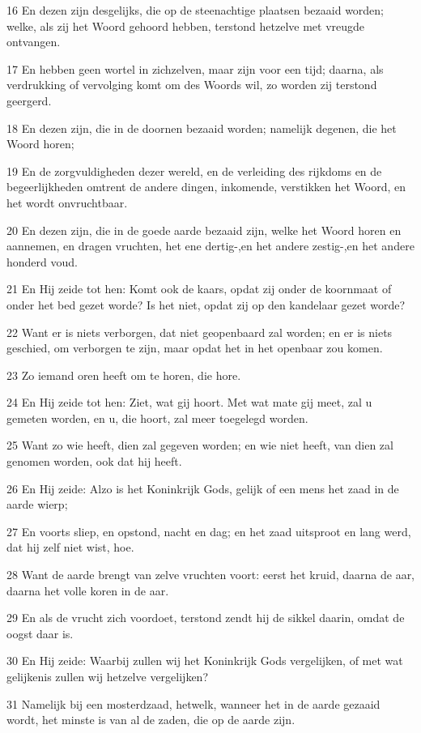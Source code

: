 \par 16 En dezen zijn desgelijks, die op de steenachtige plaatsen bezaaid worden; welke, als zij het Woord gehoord hebben, terstond hetzelve met vreugde ontvangen.
\par 17 En hebben geen wortel in zichzelven, maar zijn voor een tijd; daarna, als verdrukking of vervolging komt om des Woords wil, zo worden zij terstond geergerd.
\par 18 En dezen zijn, die in de doornen bezaaid worden; namelijk degenen, die het Woord horen;
\par 19 En de zorgvuldigheden dezer wereld, en de verleiding des rijkdoms en de begeerlijkheden omtrent de andere dingen, inkomende, verstikken het Woord, en het wordt onvruchtbaar.
\par 20 En dezen zijn, die in de goede aarde bezaaid zijn, welke het Woord horen en aannemen, en dragen vruchten, het ene dertig-,en het andere zestig-,en het andere honderd voud.
\par 21 En Hij zeide tot hen: Komt ook de kaars, opdat zij onder de koornmaat of onder het bed gezet worde? Is het niet, opdat zij op den kandelaar gezet worde?
\par 22 Want er is niets verborgen, dat niet geopenbaard zal worden; en er is niets geschied, om verborgen te zijn, maar opdat het in het openbaar zou komen.
\par 23 Zo iemand oren heeft om te horen, die hore.
\par 24 En Hij zeide tot hen: Ziet, wat gij hoort. Met wat mate gij meet, zal u gemeten worden, en u, die hoort, zal meer toegelegd worden.
\par 25 Want zo wie heeft, dien zal gegeven worden; en wie niet heeft, van dien zal genomen worden, ook dat hij heeft.
\par 26 En Hij zeide: Alzo is het Koninkrijk Gods, gelijk of een mens het zaad in de aarde wierp;
\par 27 En voorts sliep, en opstond, nacht en dag; en het zaad uitsproot en lang werd, dat hij zelf niet wist, hoe.
\par 28 Want de aarde brengt van zelve vruchten voort: eerst het kruid, daarna de aar, daarna het volle koren in de aar.
\par 29 En als de vrucht zich voordoet, terstond zendt hij de sikkel daarin, omdat de oogst daar is.
\par 30 En Hij zeide: Waarbij zullen wij het Koninkrijk Gods vergelijken, of met wat gelijkenis zullen wij hetzelve vergelijken?
\par 31 Namelijk bij een mosterdzaad, hetwelk, wanneer het in de aarde gezaaid wordt, het minste is van al de zaden, die op de aarde zijn.
